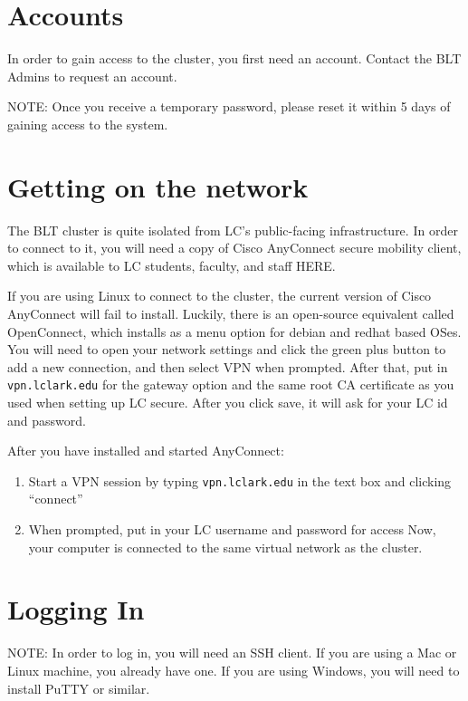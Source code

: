 \documentclass[]{book}
\providecommand{\tightlist}{%
  \setlength{\itemsep}{0pt}\setlength{\parskip}{0pt}}
\theoremstyle{definition}
\theoremstyle{definition}
\theoremstyle{definition}
\theoremstyle{remark}
\begin{document}
\section{Accounts}\label{accounts}

In order to gain access to the cluster, you first need an account.
Contact the BLT Admins to request an account.

NOTE: Once you receive a temporary password, please reset it within 5
days of gaining access to the system.

\section{Getting on the network}\label{getting-on-the-network}

The BLT cluster is quite isolated from LC's public-facing
infrastructure. In order to connect to it, you will need a copy of Cisco
AnyConnect secure mobility client, which is available to LC students,
faculty, and staff HERE.

If you are using Linux to connect to the cluster, the current version of
Cisco AnyConnect will fail to install. Luckily, there is an open-source
equivalent called OpenConnect, which installs as a menu option for
debian and redhat based OSes. You will need to open your network
settings and click the green plus button to add a new connection, and
then select VPN when prompted. After that, put in
\texttt{vpn.lclark.edu} for the gateway option and the same root CA
certificate as you used when setting up LC secure. After you click save,
it will ask for your LC id and password.

After you have installed and started AnyConnect:

\begin{enumerate}
\def\labelenumi{\arabic{enumi}.}
\tightlist
\item
  Start a VPN session by typing \texttt{vpn.lclark.edu} in the text box
  and clicking ``connect''
\item
  When prompted, put in your LC username and password for access Now,
  your computer is connected to the same virtual network as the cluster.
\end{enumerate}

\section{Logging In}\label{logging-in}

NOTE: In order to log in, you will need an SSH client. If you are using
a Mac or Linux machine, you already have one. If you are using Windows,
you will need to install PuTTY or similar.
\end{document}

